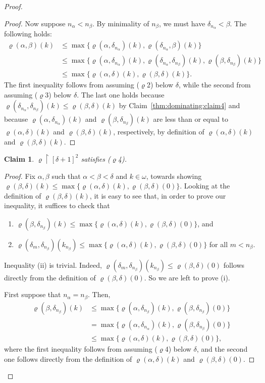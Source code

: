 \documentclass[]{amsart}
\newtheorem{claim}{Claim}[theorem]
\theoremstyle{definition}
\theoremstyle{remark}
\begin{document}
\begin{proof}
\begin{proof}
Now suppose $n_\alpha < n_\beta$. By minimality of $n_\beta$, we must have $\delta_{n_\alpha} < \beta$. The following holds:
\begin{align*}
\varrho(\alpha, \beta)(k) &\le \max\{\varrho(\alpha, \delta_{n_\alpha})(k), \varrho(\delta_{n_\alpha}, \beta)(k)\}\\&\le \max\{\varrho(\alpha, \delta_{n_\alpha})(k), \varrho(\delta_{n_\alpha}, \delta_{n_\beta})(k), \varrho(\beta, \delta_{n_\beta})(k)\}\\&\le \max\{\varrho(\alpha, \delta)(k) , \varrho(\beta, \delta)(k)\}.
\end{align*}
The first inequality follows from assuming ($\varrho$2) below $\delta$, while the second from assuming ($\varrho$3) below $\delta$. The last one holds because $\varrho(\delta_{n_\alpha}, \delta_{n_\beta})(k) \le \varrho(\beta, \delta)(k)$ by Claim~\ref{thm:dominating:claim4} and because $\varrho(\alpha, \delta_{n_\alpha})(k)$ and $\varrho(\beta, \delta_{n_\beta})(k)$ are less than or equal to $\varrho(\alpha, \delta)(k)$ and $\varrho(\beta, \delta)(k)$, respectively, by definition of $\varrho(\alpha, \delta)(k)$ and $\varrho(\beta, \delta)(k)$.
\end{proof}
\begin{claim}
$\varrho \upharpoonright [\delta + 1]^2$ satisfies {\upshape ($\varrho$4)}.
\end{claim}
\begin{proof}
Fix $\alpha, \beta$ such that $\alpha < \beta < \delta$ and $k \in \omega$, towards showing $\varrho(\beta, \delta)(k) \le \max\{\varrho(\alpha, \delta)(k) , \varrho(\beta, \delta)(0)\}$. Looking at the definition of $\varrho(\beta, \delta)(k)$, it is easy to see that, in order to prove our inequality, it suffices to check that 
\begin{enumerate}[label={(\roman*)}]
\item $\varrho(\beta, \delta_{n_\beta})(k) \le \max\{\varrho(\alpha, \delta)(k) , \varrho(\beta, \delta)(0)\}$, and
\item $\varrho(\delta_m, \delta_{n_\beta})(k_{n_\beta}) \le \max\{\varrho(\alpha, \delta)(k) , \varrho(\beta, \delta)(0)\}$ for all $m < n_\beta$.
\end{enumerate}
Inequality (ii) is trivial. Indeed,  $\varrho(\delta_m, \delta_{n_\beta})(k_{n_\beta}) \le \varrho(\beta, \delta)(0)$ follows directly from the definition of $\varrho(\beta, \delta)(0)$. So we are left to prove (i).

First suppose that $n_\alpha = n_\beta$. Then,
\begin{align*}
\varrho(\beta, \delta_{n_\beta})(k) &\le \max \{ \varrho(\alpha, \delta_{n_\beta})(k), \varrho(\beta, \delta_{n_\beta})(0)\}\\&= \max \{ \varrho(\alpha, \delta_{n_\alpha})(k), \varrho(\beta, \delta_{n_\beta})(0)\}\\&\le  \max \{ \varrho(\alpha, \delta)(k), \varrho(\beta, \delta)(0)\},
\end{align*}
where the first inequality follows from assuming ($\varrho$4) below $\delta$, and the second one follows directly from the definition of $\varrho(\alpha, \delta)(k)$ and $\varrho(\beta, \delta)(0)$.


\end{proof}
\end{proof}
\end{document}
